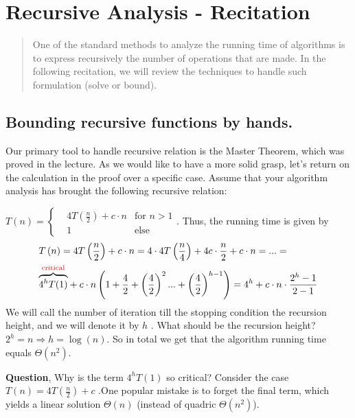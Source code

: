 

\chapter{Recursive Analysis - Recitation} 
\@makechapterhead
 
\begin{abstract}
    One of the standard methods to analyze the running time of algorithms is to express recursively the number of operations that are made. In the following recitation, we will review the techniques to handle such formulation (solve or bound).  
\end{abstract}


\section{Bounding recursive functions by hands.} Our primary tool to handle recursive relation is the Master Theorem, which was proved in the lecture. As we would like to have a more solid grasp, let's return on the calculation in the proof over a specific case. 
Assume that your algorithm analysis has brought the following recursive relation:
    \begin{example}\( T\left(n\right)  = \left\{ \begin{array}{rcl}
& 4T\left(\frac{n}{2}\right)+c\cdot n & \mbox{for }  n > 1  \\
& 1 & \mbox{else}  
\end{array}\right. \). Thus, the running time is given by \begin{equation*}
    \begin{split}
 & T\left(n\right)  = 4T\left(\frac{n}{2}\right)+c\cdot n=  4\cdot4T\left(\frac{n}{4}\right)+4c\cdot\frac{n}{2}+c\cdot n = ... = \\ & \overset{\text{\textcolor{red}{critical}}}{\overbrace{4^{h}T(1)}} + c\cdot n\left(1+\frac{4}{2}+\left(\frac{4}{2}\right)^{2}...+\left(\frac{4}{2}\right)^{h-1}\right) = 4^{h} + c\cdot n\cdot\frac{2^{h}-1}{2-1}
    \end{split}
\end{equation*}
We will call the number of iteration till the stopping condition the recursion height, and we will denote it by \(h\) . What should be the recursion height? \( 2^{h} = n \Rightarrow h =\log\left(n\right) \). So in total we get that the algorithm running time equals \( \Theta\left(n^2\right)\). 
\end{example}
\textbf{Question}, Why is the term \( 4^{h} T(1) \) so critical? Consider the case \(T\left(n\right) =  4T\left(\frac{n}{2}\right) + c \) .One popular mistake is to forget the final term, which yields a linear solution \( \Theta(n)\) (instead of quadric \( \Theta(n^2)\)).   

